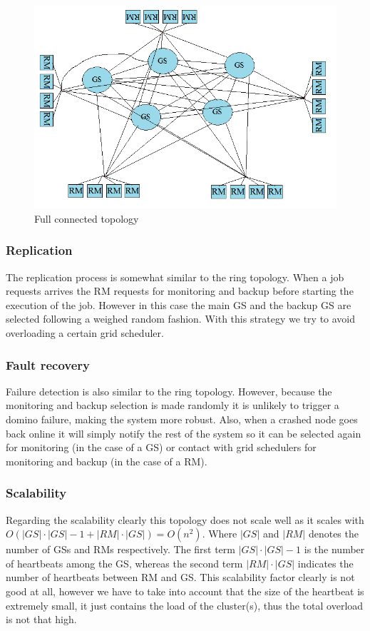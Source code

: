 \begin{figure}
\centering
	\includegraphics[scale=0.61]{full.png}
	\caption{Full connected topology}
\end{figure}

\subsubsection{Replication}

The replication process is somewhat similar to the ring topology. When a job requests arrives the RM requests for monitoring and backup before starting the execution of the job. However in this case the main GS and the backup GS are selected following a weighed random fashion. With this strategy we try to avoid overloading a certain grid scheduler.

\subsubsection{Fault recovery}

Failure detection is also similar to the ring topology. However, because the monitoring and backup selection is made randomly it is unlikely to trigger a domino failure, making the system more robust. Also, when a crashed node goes back online it will simply notify the rest of the system so it can be selected again for monitoring (in the case of a GS) or contact with grid schedulers for monitoring and backup (in the case of a RM). 

\subsubsection{Scalability}
Regarding the scalability clearly this topology does not scale well as it scales with $O(|GS|\cdot |GS|-1 + |RM|\cdot |GS|) = O(n^2)$. Where $|GS|$ and $|RM|$ denotes the number of GSs and RMs respectively. The first term $|GS|\cdot |GS|-1$ is the number of heartbeats among the GS, whereas the second term $|RM|\cdot |GS|$ indicates the number of heartbeats between RM and GS. This scalability factor clearly is not good at all, however we have to take into account that the size of the heartbeat is extremely small, it just contains the load of the cluster(s), thus the total overload is not that high.

